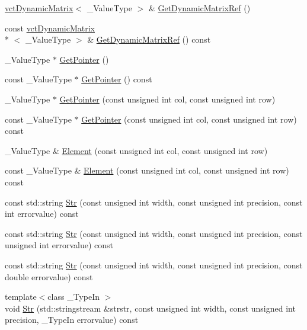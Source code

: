 \begin{DoxyCompactItemize}
\item 
\hyperlink{classvct_dynamic_matrix}{vct\-Dynamic\-Matrix}$<$ \-\_\-\-Value\-Type $>$ \& \hyperlink{classsvl_sample_matrix_custom_a931c6e5ecf6c236183db0c50b9fc9eeb}{Get\-Dynamic\-Matrix\-Ref} ()
\item 
const \hyperlink{classvct_dynamic_matrix}{vct\-Dynamic\-Matrix}\\*
$<$ \-\_\-\-Value\-Type $>$ \& \hyperlink{classsvl_sample_matrix_custom_ab653c3058872d3d6cdcaf65289fd1f5a}{Get\-Dynamic\-Matrix\-Ref} () const 
\item 
\-\_\-\-Value\-Type $\ast$ \hyperlink{classsvl_sample_matrix_custom_ae7b2387e839887ad890a5a97561deb3e}{Get\-Pointer} ()
\item 
const \-\_\-\-Value\-Type $\ast$ \hyperlink{classsvl_sample_matrix_custom_aea354a7c07e437320ba0f78eeaa32252}{Get\-Pointer} () const 
\item 
\-\_\-\-Value\-Type $\ast$ \hyperlink{classsvl_sample_matrix_custom_a76995c7d9701b923e01edac9414fc845}{Get\-Pointer} (const unsigned int col, const unsigned int row)
\item 
const \-\_\-\-Value\-Type $\ast$ \hyperlink{classsvl_sample_matrix_custom_a8eec5ee73879088ef94a68efe98ee86c}{Get\-Pointer} (const unsigned int col, const unsigned int row) const 
\item 
\-\_\-\-Value\-Type \& \hyperlink{classsvl_sample_matrix_custom_a122f12d641296f5368e82626ac512413}{Element} (const unsigned int col, const unsigned int row)
\item 
const \-\_\-\-Value\-Type \& \hyperlink{classsvl_sample_matrix_custom_a8334de003529b5b0c89de4c2570fb1a5}{Element} (const unsigned int col, const unsigned int row) const 
\item 
const std\-::string \hyperlink{classsvl_sample_matrix_custom_a3e72c267925ae2bc75f1cfabb9266992}{Str} (const unsigned int width, const unsigned int precision, const int errorvalue) const 
\item 
const std\-::string \hyperlink{classsvl_sample_matrix_custom_ab4980a4cb574effea33455a7b293baf8}{Str} (const unsigned int width, const unsigned int precision, const unsigned int errorvalue) const 
\item 
const std\-::string \hyperlink{classsvl_sample_matrix_custom_ab3ce32f3a3bfbf20239a05cb0b70acf9}{Str} (const unsigned int width, const unsigned int precision, const double errorvalue) const 
\item 
{\footnotesize template$<$class \-\_\-\-Type\-In $>$ }\\void \hyperlink{classsvl_sample_matrix_custom_a1b061c3c6ef61dc97b2dc5ee0363c3d4}{Str} (std\-::stringstream \&strstr, const unsigned int width, const unsigned int precision, \-\_\-\-Type\-In errorvalue) const 
\end{DoxyCompactItemize}

